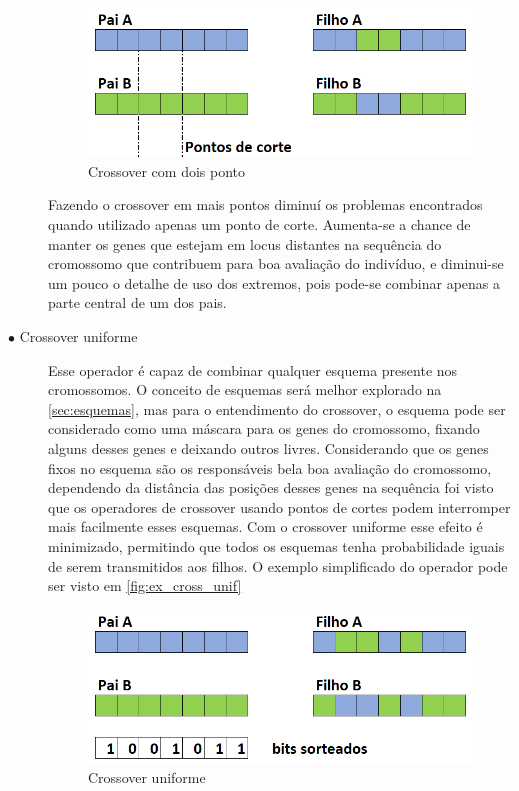 \begin{description}
\begin{figure}[ht]
	\centering
	\includegraphics[width=0.75\linewidth]{imagens/exemplo_cross_2ptos.png}
	\caption{Crossover com dois ponto}
	\label{fig:ex_cross_2pto}
\end{figure}

Fazendo o crossover em  mais pontos diminuí os problemas encontrados quando utilizado apenas um ponto de corte. Aumenta-se a chance de manter os genes que estejam em locus distantes na sequência do cromossomo que contribuem para boa avaliação do indivíduo, e diminui-se um pouco o detalhe de uso dos extremos, pois pode-se combinar apenas a parte central de um dos pais.

\item[$\bullet$ Crossover uniforme] \text{}

Esse operador é capaz de combinar qualquer esquema presente nos cromossomos. O conceito de esquemas será melhor explorado na \autoref{sec:esquemas}, mas para o entendimento do crossover, o esquema pode ser considerado como uma máscara para os genes do cromossomo, fixando alguns desses genes e deixando outros livres. Considerando que os genes fixos no esquema são os responsáveis bela boa avaliação do cromossomo, dependendo da distância das posições desses genes na sequência foi visto que os operadores de crossover usando pontos de cortes podem interromper mais facilmente esses esquemas. Com o crossover uniforme esse efeito é minimizado, permitindo que todos os esquemas tenha probabilidade iguais de serem transmitidos aos filhos. O exemplo simplificado do operador pode ser visto em \autoref{fig:ex_cross_unif}
	
	\begin{figure}[ht]
		\centering
		\includegraphics[width=0.75\linewidth]{imagens/exemplo_cross_uniforme.png}
		\caption{Crossover uniforme}
		\label{fig:ex_cross_unif}
	\end{figure}


\end{description}
